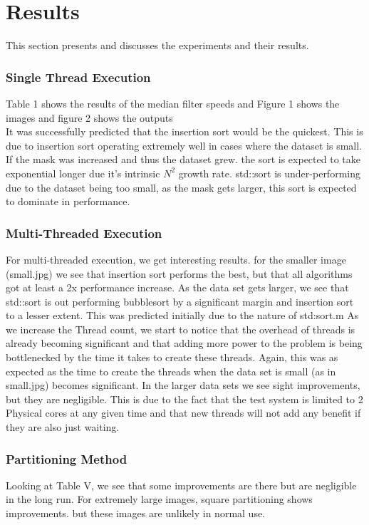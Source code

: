 \section{Results}
This section presents and discusses the experiments and their results.\\

\subsubsection{Single Thread Execution}
Table 1 shows the results of the median filter speeds and Figure 1 shows the images and figure 2 shows the outputs\\
\newline
It was successfully predicted that the insertion sort would be the quickest. This is due to insertion sort operating extremely well in cases where the dataset is small. If the mask was increased and thus the dataset grew. the sort is expected to take exponential longer due it's intrinsic $N^2$ growth rate. std::sort is under-performing due to the dataset being too small, as the mask gets larger, this sort is expected to dominate in performance.

\subsubsection{Multi-Threaded Execution}
For multi-threaded execution, we get interesting results. for the smaller image (small.jpg) we see that insertion sort performs the best, but that all algorithms got at least a 2x performance increase. As the data set gets larger, we see that std::sort is out performing bubblesort by a significant margin and insertion sort to a lesser extent. This was predicted initially due to the nature of std:sort.m
\newline
As we increase the Thread count, we start to notice that the overhead of threads is already becoming significant and that adding more power to the problem is being bottlenecked by the time it takes to create these threads. Again, this was as expected as the time to create the threads when the data set is small (as in small.jpg) becomes significant. In the larger data sets we see sight improvements, but they are negligible. This is due to the fact that the test system is limited to 2 Physical cores at any given time and that new threads will not add any benefit if they are also just waiting.

\subsubsection{Partitioning Method}
Looking at Table V, we see that some improvements are there but are negligible in the long run. For extremely large images, square partitioning shows improvements. but these images are unlikely in normal use.


